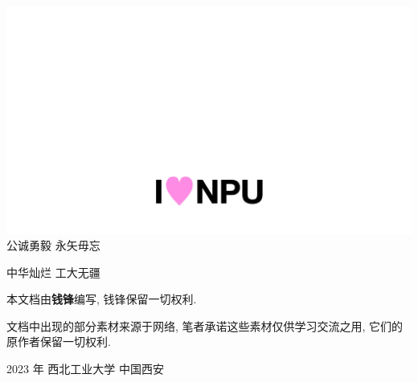 \newpage
\thispagestyle{empty}
\vspace*{5cm}
\begin{center}
    \includegraphics*[width=\textwidth]{pic/i_love_npu.jpeg}
    \large
    公诚勇毅 \quad 永矢毋忘

    中华灿烂 \quad 工大无疆
\end{center}
\vspace*{13em}
\begin{center}
    \small
    本文档由\textbf{钱锋}编写, 钱锋保留一切权利.

    文档中出现的部分素材来源于网络, 笔者承诺这些素材仅供学习交流之用, 
    它们的原作者保留一切权利.

    2023 年 \quad 西北工业大学 \quad 中国西安 
\end{center}